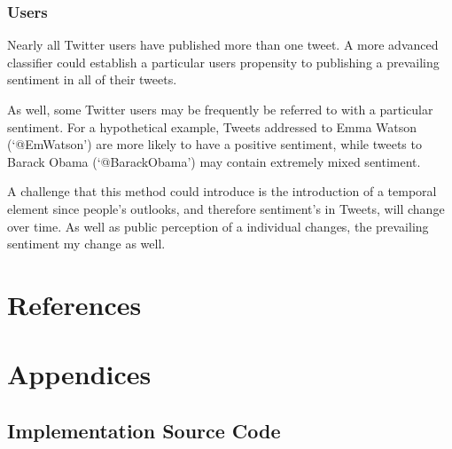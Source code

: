 \documentclass[final,3p,12pt]{elsarticle}
\begin{document}
\subsubsection{Users}

Nearly all Twitter users have published more than one tweet. A more advanced
classifier could establish a particular users propensity to publishing a
prevailing sentiment in all of their tweets.

As well, some Twitter users may be frequently be referred to with a particular
sentiment. For a hypothetical example, Tweets addressed to Emma Watson
(`@EmWatson') are more likely to have a positive sentiment, while tweets to
Barack Obama (`@BarackObama') may contain extremely mixed sentiment.

A challenge that this method could introduce is the introduction of a temporal
element since people's outlooks, and therefore sentiment's in Tweets, will
change over time. As well as public perception of a individual changes, the
prevailing sentiment my change as well.


\section{References}

\nocite{*}



\section{Appendices}

\subsection{Implementation Source Code}
\end{document}
